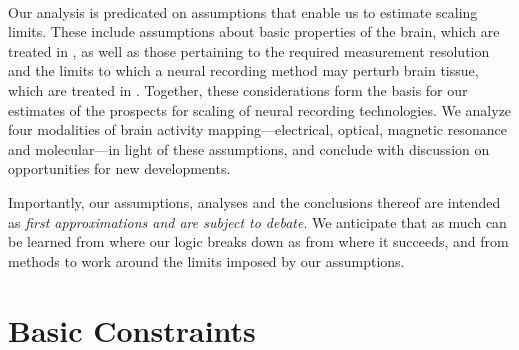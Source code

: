 \begin{figure}[htbp]
\\
\hspace{0.5in}
\end{figure}

Our analysis is predicated on assumptions that enable us to estimate scaling limits.
These include assumptions about basic properties of the brain, which are treated in , as well as those pertaining to the required measurement resolution and the limits to which a neural recording method may perturb brain tissue, which are treated in .
Together, these considerations form the basis for our estimates of the prospects for scaling of neural recording technologies.
We analyze four modalities of brain activity mapping---electrical, optical, magnetic resonance and molecular---in light of these assumptions, and conclude with discussion on opportunities for new developments.

Importantly, our assumptions, analyses and the conclusions thereof are intended as \emph{first approximations and are subject to debate}.
We anticipate that as much can be learned from where our logic breaks down as from where it succeeds, and from methods to work around the limits imposed by our assumptions.

\section{Basic Constraints}
\label{sec:constraints}

